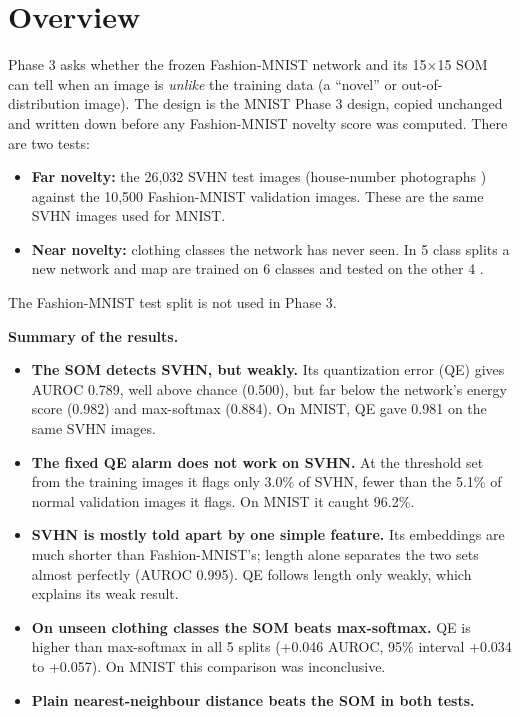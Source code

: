 \documentclass[11pt]{article}
\begin{document}
\setcounter{page}{2}
\newcommand{\tbd}{\textbf{[TBD]}}
\setlength{\emergencystretch}{3em}

\section{Overview}

Phase 3 asks whether the frozen Fashion-MNIST network and its 15$\times$15 SOM can tell when an image is \emph{unlike} the training data (a ``novel'' or out-of-distribution image). The design is the MNIST Phase 3 design, copied unchanged and written down before any Fashion-MNIST novelty score was computed. There are two tests:
\begin{itemize}[leftmargin=1.4em, itemsep=1pt]
  \item \textbf{Far novelty:} the 26,032 SVHN test images (house-number photographs \cite{netzer2011reading}) against the 10,500 Fashion-MNIST validation images. These are the same SVHN images used for MNIST.
  \item \textbf{Near novelty:} clothing classes the network has never seen. In 5 class splits a new network and map are trained on 6 classes and tested on the other 4 \cite{neal2018open}.
\end{itemize}
The Fashion-MNIST test split is not used in Phase 3.

\textbf{Summary of the results.}
\begin{itemize}[leftmargin=1.4em, itemsep=1pt]
  \item \textbf{The SOM detects SVHN, but weakly.} Its quantization error (QE) gives AUROC 0.789, well above chance (0.500), but far below the network's energy score (0.982) and max-softmax (0.884). On MNIST, QE gave 0.981 on the same SVHN images.
  \item \textbf{The fixed QE alarm does not work on SVHN.} At the threshold set from the training images it flags only 3.0\% of SVHN, fewer than the 5.1\% of normal validation images it flags. On MNIST it caught 96.2\%.
  \item \textbf{SVHN is mostly told apart by one simple feature.} Its embeddings are much shorter than Fashion-MNIST's; length alone separates the two sets almost perfectly (AUROC 0.995). QE follows length only weakly, which explains its weak result.
  \item \textbf{On unseen clothing classes the SOM beats max-softmax.} QE is higher than max-softmax in all 5 splits (+0.046 AUROC, 95\% interval +0.034 to +0.057). On MNIST this comparison was inconclusive.
  \item \textbf{Plain nearest-neighbour distance beats the SOM in both tests.}
\end{itemize}
\end{document}
